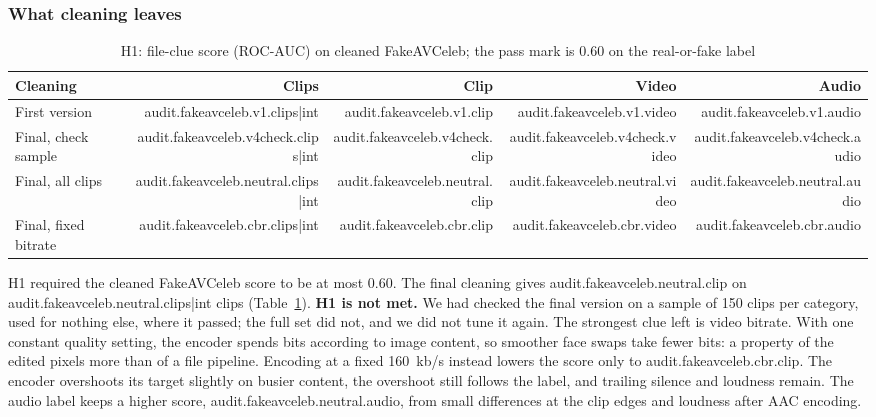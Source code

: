 \documentclass[conference]{IEEEtran}
\begin{document}
\subsubsection{What cleaning leaves}
\label{sec:left}

\begin{table}[htbp]
\caption{H1: file-clue score (ROC-AUC) on cleaned FakeAVCeleb; the pass mark is
0.60 on the real-or-fake label}
\label{tab:h1}
\centering
\begin{tabular}{lrrrr}
\toprule
Cleaning & Clips & Clip & Video & Audio \\
\midrule
First version & {{audit.fakeavceleb.v1.clips|int}} & {{audit.fakeavceleb.v1.clip}} & {{audit.fakeavceleb.v1.video}} & {{audit.fakeavceleb.v1.audio}} \\
Final, check sample & {{audit.fakeavceleb.v4check.clips|int}} & {{audit.fakeavceleb.v4check.clip}} & {{audit.fakeavceleb.v4check.video}} & {{audit.fakeavceleb.v4check.audio}} \\
Final, all clips & {{audit.fakeavceleb.neutral.clips|int}} & {{audit.fakeavceleb.neutral.clip}} & {{audit.fakeavceleb.neutral.video}} & {{audit.fakeavceleb.neutral.audio}} \\
Final, fixed bitrate & {{audit.fakeavceleb.cbr.clips|int}} & {{audit.fakeavceleb.cbr.clip}} & {{audit.fakeavceleb.cbr.video}} & {{audit.fakeavceleb.cbr.audio}} \\
\bottomrule
\end{tabular}
\end{table}

H1 required the cleaned FakeAVCeleb score to be at most 0.60. The final
cleaning gives {{audit.fakeavceleb.neutral.clip}} on
{{audit.fakeavceleb.neutral.clips|int}} clips (Table~\ref{tab:h1}).
\textbf{H1 is not met.} We had checked the final version on a sample of 150
clips per category, used for nothing else, where it passed; the full set did
not, and we did not tune it again. The strongest clue left is video bitrate.
With one constant quality setting, the encoder spends bits according to image
content, so smoother face swaps take fewer bits: a property of the edited
pixels more than of a file pipeline. Encoding at a fixed 160~kb/s instead
lowers the score only to {{audit.fakeavceleb.cbr.clip}}. The encoder overshoots
its target slightly on busier content, the overshoot still follows the label,
and trailing silence and loudness remain. The audio label keeps a higher score,
{{audit.fakeavceleb.neutral.audio}}, from small differences at the clip edges
and loudness after AAC encoding.
\end{document}

